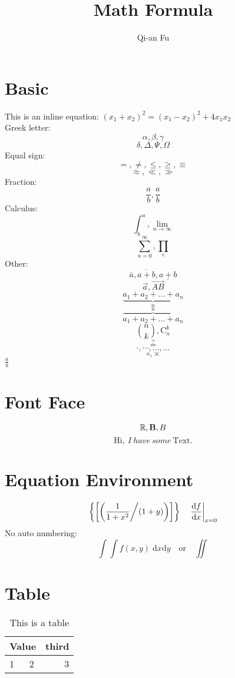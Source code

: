\documentclass[12pt]{article}
\author{Qi-an Fu}
\title{Math Formula}
\begin{document}
\maketitle
\tableofcontents
\listoftables

\section{Basic}
This is an inline equation:
$ (x_1 + x_2)^2 = (x_1 - x_2)^2 + 4 x_1 x_2 $ \\
Greek letter:
\[ \alpha, \beta, \gamma \]
\[ \delta, \Delta, \Psi, \Omega \]
Equal sign:
\[ =, \neq, \leq, \geq, \equiv \]
\[ \approx, \ll, \gg \]
Fraction:
\[ \frac{a}{b}, \frac ab \]
Calculus:
\[ \int^a_b, \lim_{n \rightarrow \infty} \]
\[ \sum_{n=0}^{\infty}, \prod_\epsilon \]
Other:
\[ \bar{a}, \overline{a+b}, \underline{a+b} \]
\[ \vec{a}, \overrightarrow{AB} \]
\[ \underbrace{a_1+a_2+\ldots+a_n}_n \]
\[ \overbrace{a_1+a_2+\ldots+a_n}^n \]
\[ \binom{n}{k}, \mathrm{C}_n^k \]
\[ \stackrel{?}{=} \]
\[ \cdot, \cdots, \dots, \ldots \]
\[ \circ, \times \]
$ {\displaystyle \frac ab} $
\section{Font Face}
\[ \mathbb{R}, \mathbf{B}, \boldmath{B} \]
\[ \mathrm{Hi},\ I\ have\ some\ \text{Text}. \]
\section{Equation Environment}
\begin{equation}
  \label{eq1}
  \left\{ \left[ \left( \frac{1}{1+x^2} \middle/ (1 + y) \right) \right] \right\}
  \quad \left. \frac{\mathrm{d}f}{\mathrm{d}x} \right|_{x = 0}
\end{equation}
No auto numbering:
\begin{equation*}
  \int\!\!\!\int f(x, y) \; \mathrm{d} x \mathrm{d} y
  \quad \text{or} \quad \iint
\end{equation*}
\section{Table}
\begin{table}[htbp]
  \begin{center}
    \begin{tabular}{|l|c|r|}
      \hline
      \multicolumn{2}{|c|}{Value} & third \\ \hline
      1           & 2             & 3     \\ \cline{1-1}
    \end{tabular}
    \caption{This is a table}
    \label{tab1}
  \end{center}
\end{table}
\end{document}
